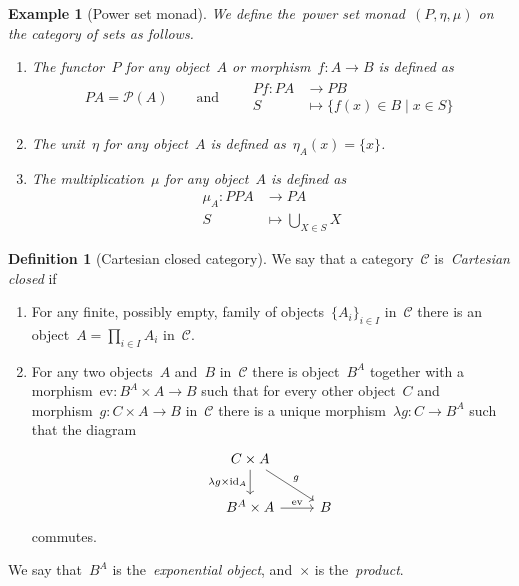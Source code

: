 \documentclass[a4paper]{article}
\theoremstyle{plain}
\newtheorem{example}[theorem]{Example}
\theoremstyle{definition}
\newtheorem{definition}[theorem]{Definition}
\newcommand{\id}{\mathrm{id}}
\newcommand{\ev}{\mathrm{ev}}
\newcommand{\cat}[1]{\mathcal{#1}}
\begin{document}
\begin{example}[Power set monad]
    \label{monad:power-set}
    We define the~\emph{power set monad}~\((P,\eta,\mu)\) on the category of
    sets as follows.
    \begin{enumerate}
        \item The functor~\(P\) for any object~\(A\) or
            morphism~\(f:A\longrightarrow B\) is defined as
            \begin{gather*}
                PA = \mathcal{P}(A)
                \qquad\text{and}\qquad
                \begin{split}
                    Pf:PA&\longrightarrow PB \\
                    S&\longmapsto\{f(x)\in B \mid x\in S\}
                \end{split}
            \end{gather*}
        \item The unit~\(\eta\) for any object~\(A\) is defined
            as~\(\eta_{A}(x)=\{x\}\).
        \item The multiplication~\(\mu\) for any object~\(A\) is defined as
            \begin{align*}
                \mu_{A}:PPA&\longrightarrow PA \\
                S&\longmapsto \bigcup_{X\in S}X
            \end{align*}
    \end{enumerate}
\end{example}

\begin{definition}[Cartesian closed category]
    \label{def:product}
    \label{def:cartesian-closed}
    \label{def:exponential object}
    We say that a category~\(\cat{C}\) is~\emph{Cartesian closed} if
    \begin{enumerate}
        \item For any finite, possibly empty, family of
            objects~\(\{A_{i}\}_{i\in I}\) in~\(\cat{C}\) there is an
            object~\(A=\prod_{i\in I}A_{i}\) in~\(\cat{C}\).
        \item For any two objects~\(A\) and~\(B\) in~\(\cat{C}\) there is
            object~\(B^{A}\) together with a
            morphism~\(\ev:B^{A}\times A\longrightarrow B\) such that for every
            other object~\(C\) and morphism~\(g:C\times A\longrightarrow B\)
            in~\(\cat{C}\) there is a unique
            morphism~\(\lambda g:C\longrightarrow B^{A}\) such that the diagram
            \[\begin{tikzcd}
                C\times A \arrow[dr, "g"] \arrow[d, "\lambda g\times\id_{A}", swap] & \\
                B^{A}\times A \arrow[r, "\ev"] & B
            \end{tikzcd}\]
            commutes.
    \end{enumerate}
    We say that~\(B^{A}\) is the~\emph{exponential object}, and~\(\times\) is
    the~\emph{product}.
\end{definition}
\end{document}

